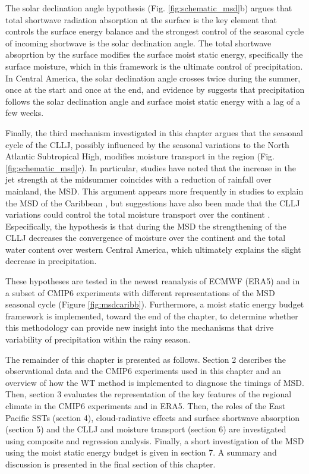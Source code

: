 The solar declination angle hypothesis (Fig. \ref{fig:schematic_msd}b) argues that total shortwave radiation absorption at the surface is the key element that controls the surface energy balance and the strongest control of the seasonal cycle of incoming shortwave is the solar declination angle. The total shortwave absoprtion by the surface modifies the surface moist static energy, specifically the surface moisture, which in this framework is the ultimate control of precipitation. In Central America, the solar declination angle crosses twice during the summer, once at the start and once at the end, and evidence by \cite{karnauskas2013} suggests that precipitation follows the solar declination angle and surface moist static energy with a lag of a few weeks.

Finally, the third mechanism investigated in this chapter argues that the seasonal cycle of the CLLJ, possibly influenced by the seasonal variations to the North Atlantic Subtropical High, modifies moisture transport in the region (Fig. \ref{fig:schematic_msd}c). In particular, studies have noted that the increase in the jet strength at the midsummer coincides with a reduction of rainfall over mainland, the MSD. This argument appears more frequently in studies to explain the MSD of the Caribbean \citep{martinez2019}, but suggestions have also been made that the CLLJ variations could control the total moisture transport over the continent \citep{herrera2015}. Especifically, the hypothesis is that during the MSD the strengthening of the CLLJ decreases the convergence of moisture over the continent and the total water content over western Central America, which ultimately explains the slight decrease in precipitation.

These hypotheses are tested in the newest reanalysis of ECMWF (ERA5) and in a subset of CMIP6 experiments with different representations of the MSD seasonal cycle (Figure \ref{fig:msdcaribb}). 
Furthermore, a moist static energy budget framework is implemented, toward the end of the chapter, to determine whether this methodology can provide new insight into the mechanisms that drive variability of precipitation within the rainy season. 
 


 
The remainder of this chapter is presented as follows. Section 2 describes the observational data and the CMIP6 experiments used in this chapter and an overview of how the WT method is implemented to diagnose the timings of MSD. Then, section 3 evaluates the representation of the key features of the regional climate in the CMIP6 experiments and in ERA5.
Then, the roles of the East Pacific SSTs (section 4), cloud-radiative effects and surface shortwave absorption (section 5) and the CLLJ and moisture transport (section 6) are investigated using composite and regression analysis. Finally, a short investigation of the MSD using the moist static energy budget is given in section 7. A summary and discussion is presented in the final section of this chapter. 
  
